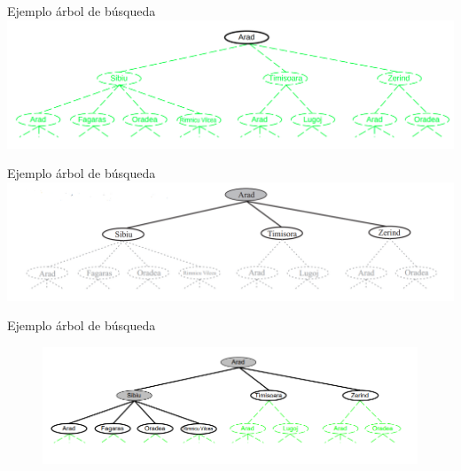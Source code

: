 \documentclass{beamer}
\theoremstyle{definition}
\theoremstyle{theorem}
\theoremstyle{remark}
\begin{document}
\begin{frame}{Ejemplo árbol de búsqueda}{}
    \includegraphics[scale=0.2]{26_chap3_pag26.png}
\end{frame}

\begin{frame}{Ejemplo árbol de búsqueda}{}
    \includegraphics[scale =0.3]{chap3-pag27.PNG}
    
\end{frame}

\begin{frame}{Ejemplo árbol de búsqueda}
    \begin{figure}
        \centering
        \includegraphics[width = 112mm, scale = 1]{Chapter3Slide28.png}
    \end{figure}
    
\end{frame}
\end{document}
